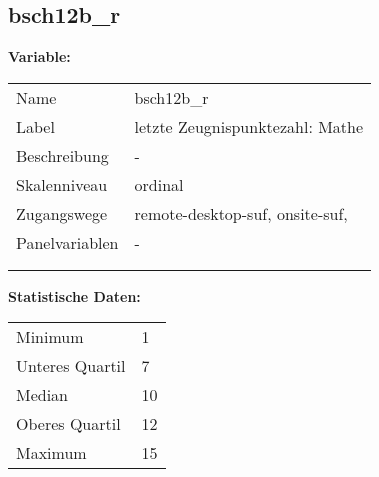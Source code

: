 	
	
	\subsection{bsch12b\_r}
	\label{subSection:bsch12b_r}

	\noindent\textbf{Variable:}\\
		\begin{tabular}{lL{11.3cm}}
			\label{tableVariable:bsch12b_r}
			Name & bsch12b\_r \\
			Label & letzte Zeugnispunktezahl: Mathe \\
			Beschreibung & - \\
			Skalenniveau & ordinal \\
			Zugangswege &
				remote-desktop-suf,
				onsite-suf,
 \\
			Panelvariablen & -
			 \\
			 \\
 \\
		\end{tabular}



		\vspace*{1 cm}
		\noindent\textbf{Statistische Daten:}\\
			\begin{tabular}{ll}
				\label{tableStatistics:bsch12b_r}
					Minimum & 1 \\
					Unteres Quartil & 7 \\
					Median & 10 \\
					Oberes Quartil & 12 \\
					Maximum & 15 \\
			\end{tabular}



